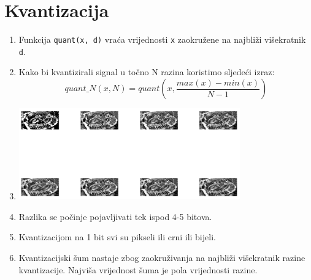 \documentclass[12pt, a4]{report}
\begin{document}
        \section{Kvantizacija}
            \begin{enumerate}
                \item 
                    Funkcija \verb|quant(x, d)| vraća vrijednosti \verb|x| zaokružene na najbliži višekratnik \verb|d|.  
                \item
                    Kako bi kvantizirali signal u točno N razina koristimo sljedeći izraz:
                    \begin{equation}
                        quant\_N(x, N) = quant(x, \frac{max(x) - min(x)}{N - 1})
                    \end{equation}
                \item
                    \begin{minipage}{\linewidth}
                        \centering
                        \includegraphics[width=0.75\textwidth]{quant}
                    \end{minipage}
                \item
                    Razlika se počinje pojavljivati tek ispod 4-5 bitova.
                \item
                    Kvantizacijom na 1 bit svi su pikseli ili crni ili bijeli.
                \item
                    Kvantizacijski šum nastaje zbog zaokruživanja na najbliži višekratnik razine kvantizacije. Najviša vrijednost šuma je pola vrijednosti razine.        
            \end{enumerate}
\end{document}
